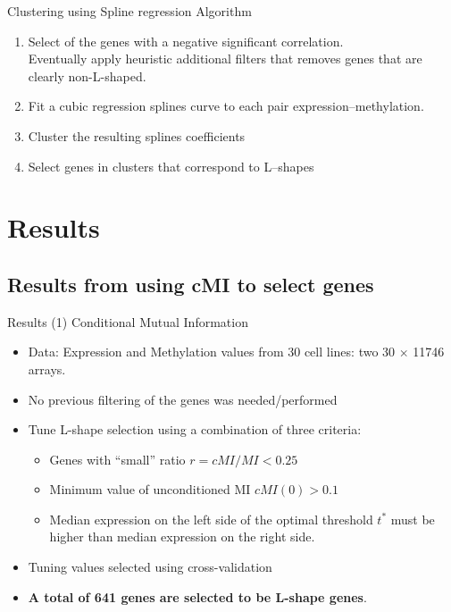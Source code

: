 \documentclass[handout]{beamer}
\begin{document}
\begin{frame}{Clustering using Spline regression}
Algorithm
\begin {enumerate}
\item Select of the genes with a negative significant correlation.
    \\ Eventually apply heuristic additional filters that removes genes that are clearly non-L-shaped.
\item Fit a cubic regression splines curve to each pair expression--methylation.
\item Cluster the resulting splines coefficients
\item Select genes in clusters that correspond to L--shapes
\end{enumerate}
\end{frame}

\section{Results}



\subsection{Results from using cMI to select genes}
\begin{frame}{Results (1) Conditional Mutual Information}
\begin {itemize}
\item Data: Expression and Methylation values from 30 cell lines: two 30 $\times$ 11746 arrays.
\item No previous filtering of the genes was needed/performed
\item Tune L-shape selection using a combination of three criteria:
\begin{itemize}
\item Genes with ``small'' ratio  $r=cMI/MI <0.25$
\item Minimum value of unconditioned MI $\mathit{cMI}(0)>0.1$
\item Median expression on the left side of the optimal threshold $t^{\ast}$ must be higher
than median expression on the right side.
\end{itemize}
\item Tuning values selected using cross-validation
\item %
\textbf{A total of 641 genes are selected to be L-shape genes}.
\end{itemize}
\end{frame}
\end{document}
